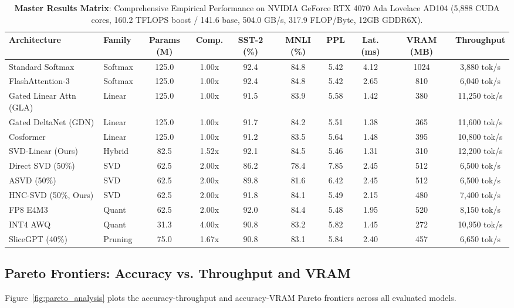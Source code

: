 \documentclass{article}
\begin{document}
\begin{table}[t]
\centering
\tiny
\setlength{\tabcolsep}{2.5pt}
\caption{\textbf{Master Results Matrix}: Comprehensive Empirical Performance on NVIDIA GeForce RTX 4070 Ada Lovelace AD104 (5,888 CUDA cores, 160.2 TFLOPS boost / 141.6 base, 504.0 GB/s, 317.9 FLOP/Byte, 12GB GDDR6X).}
\label{tab:master_results_matrix}
\begin{tabular}{llcccccccc}
\toprule
\textbf{Architecture} & \textbf{Family} & \textbf{Params (M)} & \textbf{Comp.} & \textbf{SST-2 (\%)} & \textbf{MNLI (\%)} & \textbf{PPL} & \textbf{Lat. (ms)} & \textbf{VRAM (MB)} & \textbf{Throughput} \\
\midrule
Standard Softmax & Softmax & 125.0 & 1.00x & 92.4 & 84.8 & 5.42 & 4.12 & 1024 & 3,880 tok/s \\
FlashAttention-3 & Softmax & 125.0 & 1.00x & 92.4 & 84.8 & 5.42 & 2.65 & 810 & 6,040 tok/s \\
Gated Linear Attn (GLA) & Linear & 125.0 & 1.00x & 91.5 & 83.9 & 5.58 & 1.42 & 380 & 11,250 tok/s \\
Gated DeltaNet (GDN) & Linear & 125.0 & 1.00x & 91.7 & 84.2 & 5.51 & 1.38 & 365 & 11,600 tok/s \\
Cosformer & Linear & 125.0 & 1.00x & 91.2 & 83.5 & 5.64 & 1.48 & 395 & 10,800 tok/s \\
SVD-Linear (Ours) & Hybrid & 82.5 & 1.52x & 92.1 & 84.5 & 5.46 & 1.31 & 310 & 12,200 tok/s \\
Direct SVD (50\%) & SVD & 62.5 & 2.00x & 86.2 & 78.4 & 7.85 & 2.45 & 512 & 6,500 tok/s \\
ASVD (50\%) & SVD & 62.5 & 2.00x & 89.8 & 81.6 & 6.42 & 2.45 & 512 & 6,500 tok/s \\
HNC-SVD (50\%, Ours) & SVD & 62.5 & 2.00x & 91.8 & 84.1 & 5.49 & 2.15 & 480 & 7,400 tok/s \\
FP8 E4M3 & Quant & 62.5 & 2.00x & 92.0 & 84.4 & 5.48 & 1.95 & 520 & 8,150 tok/s \\
INT4 AWQ & Quant & 31.3 & 4.00x & 90.8 & 83.2 & 5.82 & 1.45 & 272 & 10,950 tok/s \\
SliceGPT (40\%) & Pruning & 75.0 & 1.67x & 90.8 & 83.1 & 5.84 & 2.40 & 457 & 6,650 tok/s \\
\bottomrule
\end{tabular}
\end{table}

\subsection{Pareto Frontiers: Accuracy vs. Throughput and VRAM}
Figure~\ref{fig:pareto_analysis} plots the accuracy-throughput and accuracy-VRAM Pareto frontiers across all evaluated models.
\end{document}
